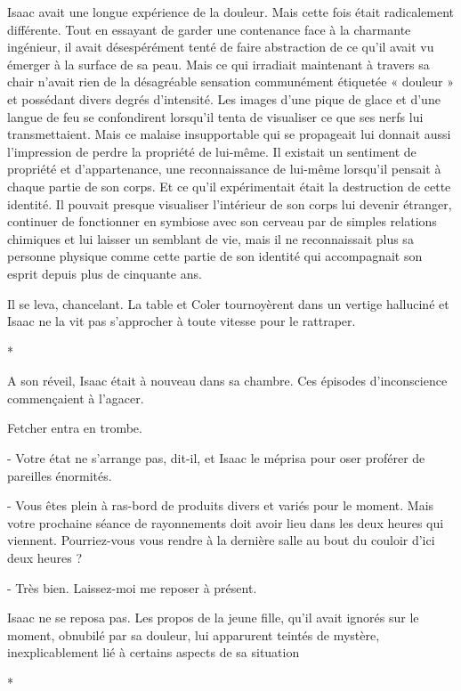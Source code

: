 \documentclass[12pt]{book}
\newcommand{\s}{\begin{center}
*
\end{center}
}
\begin{document}
Isaac avait une longue expérience de la douleur. Mais cette fois était radicalement différente. Tout en essayant de garder une contenance face à la charmante ingénieur, il avait désespérément tenté de faire abstraction de ce qu’il avait vu émerger à la surface de sa peau. Mais ce qui irradiait maintenant à travers sa chair n’avait rien de la désagréable sensation communément étiquetée « douleur » et possédant divers degrés d’intensité. Les images d’une pique de glace et d’une langue de feu se confondirent lorsqu’il tenta de visualiser ce que ses nerfs lui transmettaient. Mais ce malaise insupportable qui se propageait lui donnait aussi l'impression de perdre la propriété de lui-même. Il existait un sentiment de propriété et d’appartenance, une reconnaissance de lui-même lorsqu’il pensait à chaque partie de son corps. Et ce qu’il expérimentait était la destruction de cette identité. Il pouvait presque visualiser l’intérieur de son corps lui devenir étranger, continuer de fonctionner en symbiose avec son cerveau par de simples relations chimiques et lui laisser un semblant de vie, mais il ne reconnaissait plus sa personne physique comme cette partie de son identité qui accompagnait son esprit depuis plus de cinquante ans.


Il se leva, chancelant. La table et Coler tournoyèrent dans un vertige halluciné et Isaac ne la vit pas s’approcher à toute vitesse pour le rattraper.


\s


A son réveil, Isaac était à nouveau dans sa chambre. Ces épisodes d’inconscience commençaient à l’agacer.


Fetcher entra en trombe.


-  Votre état ne s’arrange pas, dit-il, et Isaac le méprisa pour oser proférer de pareilles énormités.


 - Vous êtes plein à ras-bord de produits divers et variés pour le moment. Mais votre prochaine séance de rayonnements doit avoir lieu dans les deux heures qui viennent. Pourriez-vous vous rendre à la dernière salle au bout du couloir d’ici deux heures ?


- Très bien. Laissez-moi me reposer à présent.


Isaac ne se reposa pas. Les propos de la jeune fille, qu’il avait ignorés sur le moment, obnubilé par sa douleur, lui apparurent teintés de mystère, inexplicablement lié à certains aspects de sa situation

\s
\end{document}
